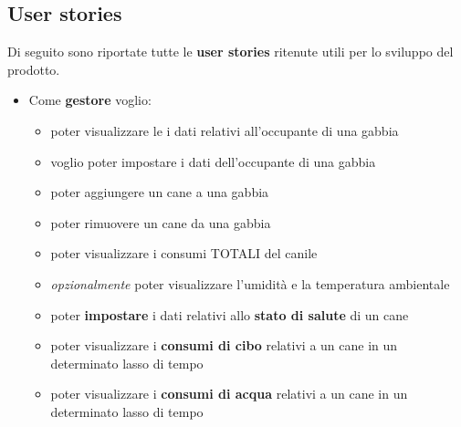         \subsection{User stories}
        Di seguito sono riportate tutte le \textbf{user stories} ritenute utili per lo sviluppo del prodotto.
        \begin{itemize}
            \item Come \textbf{gestore}
            voglio:
            \begin{itemize}
                \item poter visualizzare le i dati relativi all’occupante di una gabbia
                \item voglio poter impostare i dati dell’occupante di una gabbia
                \item poter aggiungere un cane a una gabbia
                \item poter rimuovere un cane da una gabbia
                \item poter visualizzare i consumi TOTALI del canile
                \item \textit{opzionalmente} poter visualizzare l’umidità e la temperatura ambientale 
                \item poter \textbf{impostare} i dati relativi allo \textbf{stato di salute} di un cane
                \item poter visualizzare i \textbf{consumi di cibo} relativi a un cane in un determinato lasso di tempo
                \item poter visualizzare i \textbf{consumi di acqua} relativi a un cane in un determinato lasso di tempo
            \end{itemize}
            

\end{itemize}
